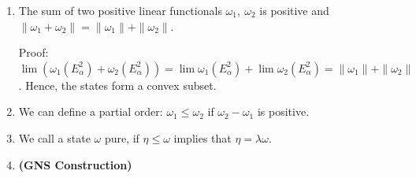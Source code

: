 \documentclass[twoside,symmetric, openany, 12pt]{./tuftebook}
\theoremstyle{definition}
\theoremstyle{definition}
\theoremstyle{definition}
\begin{document}
\begin{enumerate}
\begin{itemize}
				Hence, $|\beta + \gamma| \le \sqrt{\|A\|^2 + \gamma^2} $ for all $\gamma$. If we choose $\gamma=\delta \|A\|^2 \beta / |\beta|$, we find that $\beta^2 + 2\delta |\beta| \|A\|^2 \le \|A\|^2$. Sending $\delta\to\infty$, we find that $\beta = 0$.
			\item \textbf{(Final Steps)} Since $A^*A \ge 0$, 
				\[
					\|\mathbbm{1} - \frac{A^* A}{\|A^* A\|}\|=\|1- \frac{A^* A}{\|A\|^2}\|\le 1
				.\] 
				We then have
				\[
					\left| \omega(\mathbbm{1}) - \frac{\omega(A^* A)}{\|A\|^2} \right|\le 1 
				\]
				and
				\[
				\left| 1 - \frac{\omega(A^* A)}{\|A\|^2} \right| \le 1
				.\] 
				This shows that $\omega$ is positive.
		\end{itemize}
	\item The sum of two positive linear functionals $\omega_1,~\omega_2$ is positive and $\|\omega_1+\omega_2\|=\|\omega_1\|+\|\omega_2\|$. 

		Proof: $\lim (\omega_1(E_\alpha^2) +\omega_2(E_\alpha^2)) = \lim\omega_1(E_\alpha^2) + \lim\omega_2(E_\alpha^2)=\|\omega_1\|+\|\omega_2\| $. Hence, the states form a convex subset.
	\item We can define a partial order: $\omega_1\le \omega_2$ if $\omega_2-\omega_1$ is positive.
	\item We call a state $\omega$ pure, if $\eta\le\omega$ implies that $\eta=\lambda\omega $.
	\item \textbf{(GNS Construction)} 
		\end{enumerate}
\end{document}
